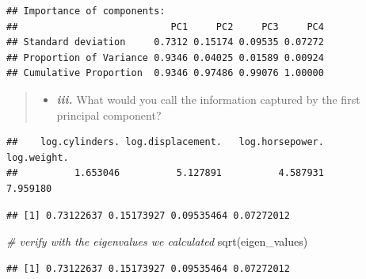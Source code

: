 \documentclass[
]{article}
\newenvironment{Shaded}{\begin{snugshade}}{\end{snugshade}}
\newcommand{\CommentTok}[1]{\textcolor[rgb]{0.56,0.35,0.01}{\textit{#1}}}
\newcommand{\FunctionTok}[1]{\textcolor[rgb]{0.00,0.00,0.00}{#1}}
\newcommand{\NormalTok}[1]{#1}
\newcommand{\SpecialCharTok}[1]{\textcolor[rgb]{0.00,0.00,0.00}{#1}}
\providecommand{\tightlist}{%
  \setlength{\itemsep}{0pt}\setlength{\parskip}{0pt}}
\begin{document}
\begin{verbatim}
## Importance of components:
##                           PC1     PC2     PC3     PC4
## Standard deviation     0.7312 0.15174 0.09535 0.07272
## Proportion of Variance 0.9346 0.04025 0.01589 0.00924
## Cumulative Proportion  0.9346 0.97486 0.99076 1.00000
\end{verbatim}

\begin{quote}
\begin{itemize}
\tightlist
\item
  \textbf{\emph{iii.}} What would you call the information captured by
  the first principal component?
\end{itemize}
\end{quote}

\begin{Shaded}
\end{Shaded}

\begin{verbatim}
##    log.cylinders. log.displacement.   log.horsepower.       log.weight. 
##          1.653046          5.127891          4.587931          7.959180
\end{verbatim}

\begin{Shaded}
\end{Shaded}

\begin{verbatim}
## [1] 0.73122637 0.15173927 0.09535464 0.07272012
\end{verbatim}

\begin{Shaded}
\begin{Highlighting}[]
\CommentTok{\# verify with the eigenvalues we calculated}
\FunctionTok{sqrt}\NormalTok{(eigen\_values)}
\end{Highlighting}
\end{Shaded}

\begin{verbatim}
## [1] 0.73122637 0.15173927 0.09535464 0.07272012
\end{verbatim}
\end{document}
